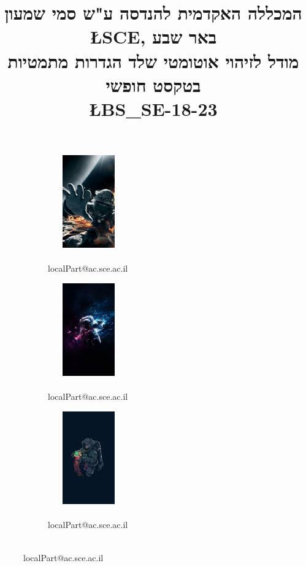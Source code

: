 \documentclass[11pt]{article}
\title{%
\small
המכללה האקדמית להנדסה ע"ש סמי שמעון \L{SCE}, באר שבע\\ \vspace{+1em}
\Large
מודל לזיהוי אוטומטי שלד
הגדרות מתמטיות בטקסט
חופשי\\
\L{BS\_SE-18-23}\vspace{-3.5em}}
\date{}
\begin{document}
\maketitle
{}
\begin{figure}[h]
   \centering
   
    \begin{subfigure}[b]{0.31\textwidth}
        \centering
        \includegraphics[height=40mm, width=35mm]{pic1.jpg}
        \\     {\\ localPart@ac.sce.ac.il}
    \end{subfigure}
    \quad
    \begin{subfigure}[b]{0.31\textwidth} 
        \centering 
        \includegraphics[height=40mm, width=35mm]{pic2.jpg}
        \caption*{\\ localPart@ac.sce.ac.il}
    \end{subfigure}
    \quad
    \begin{subfigure}[b]{0.31\textwidth} 
        \centering 
        \includegraphics[height=40mm, width=35mm]{pic3.jpg}
        \caption*{\\ localPart@ac.sce.ac.il}
    \end{subfigure}
\end{figure}
\thispagestyle{empty}
\end{document}
